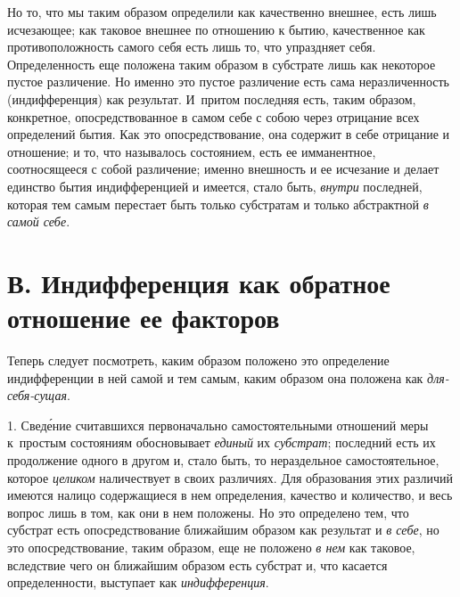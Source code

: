 Но то, что мы таким образом определили как качественно внешнее, есть лишь
исчезающее; как таковое внешнее по отношению к бытию, качественное как
противоположность самого себя есть лишь то, что упраздняет себя.
Определенность еще положена таким образом в субстрате лишь как некоторое
пустое различение. Но именно это пустое различение есть сама
неразличенность (индифференция) как результат. И~притом последняя есть,
таким образом, конкретное, опосредствованное в самом себе с собою через
отрицание всех определений бытия. Как это опосредствование, она содержит в
себе отрицание и отношение; и то, что называлось состоянием, есть ее
имманентное, соотносящееся с собой различение; именно внешность и ее
исчезание и делает единство бытия индифференцией и имеется, стало быть,
{\em внутри} последней, которая тем самым перестает
быть только субстратам и только абстрактной {\em в самой себе}.

\section[В. Индифференция как обратное отношение ее факторов]%
  {В. Индифференция как обратное отношение
   ее факторов}

Теперь следует посмотреть, каким
образом положено это определение индифференции в ней самой и тем самым,
каким образом она положена как {\em для-себя-сущая}.

1. Свед\'{е}ние считавшихся первоначально самостоятельными отношений меры
к~простым состояниям обосновывает {\em единый} их
{\em субстрат}; последний есть их продолжение одного в
другом и, стало быть, то нераздельное самостоятельное, которое
{\em целиком} наличествует в своих различиях. Для
образования этих различий имеются налицо содержащиеся в нем определения,
качество и количество, и весь вопрос лишь в том, как они в нем положены. Но
это определено тем, что субстрат есть опосредствование ближайшим образом
как результат и {\em в себе}, но это опосредствование,
таким образом, еще не положено {\em в нем} как таковое,
вследствие чего он ближайшим образом есть субстрат и, что касается
определенности, выступает как {\em индифференция}.

